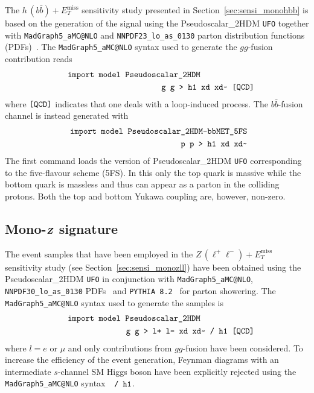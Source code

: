 \documentclass[a4paper, 11pt,notoc]{article}
\newcommand{\MET}{\ensuremath{E_T^\mathrm{miss}}\xspace}
\def\bm#1{\mbox{\boldmath$#1$\unboldmath}}
\begin{document}
The $h \, (b \bar b) + \MET$ sensitivity study presented in Section~\ref{sec:sensi_monohbb} is based on the generation of the signal using the Pseudoscalar\_2HDM {\tt UFO} together with {\tt MadGraph5\_aMC@NLO} and {\tt NNPDF23\_lo\_as\_0130} parton distribution functions (PDFs)~\cite{Ball:2012cx}. The {\tt MadGraph5\_aMC@NLO}  syntax used to generate the $gg$-fusion contribution reads 
\begin{eqnarray}
&& \verb| import model Pseudoscalar_2HDM | \hspace{2.25cm} \nonumber \\
&& \verb| g g > h1 xd xd~ [QCD] | \nonumber 
\end{eqnarray}
where  $\verb|[QCD]|$ indicates that one deals with a loop-induced process. The $b \bar b$-fusion channel is instead generated with 
\begin{eqnarray}
&& \verb| import model Pseudoscalar_2HDM-bbMET_5FS  | \nonumber \\
&& \verb| p p > h1 xd xd~  | \nonumber 
\end{eqnarray}
The first command loads the version of Pseudoscalar\_2HDM {\tt UFO}  corresponding to the five-flavour scheme (5FS). In this only the top quark is massive while the bottom quark is massless and thus 
can appear as a parton in the colliding protons. Both the top and bottom Yukawa coupling  are, however, non-zero.

\subsection{Mono-$\bm{Z}$ signature}

The event samples that have been employed in the $Z \, (\ell^+ \ell^-) + \MET$ sensitivity study (see Section~\ref{sec:sensi_monozll}) have been obtained using the Pseudoscalar\_2HDM {\tt UFO} in conjunction with {\tt MadGraph5\_aMC@NLO}, {\tt NNPDF30\_lo\_as\_0130} PDFs~\cite{Ball:2014uwa} and  {\tt PYTHIA~8.2}~\cite{Sjostrand:2014zea} for parton showering.  The {\tt MadGraph5\_aMC@NLO}  syntax used to generate the samples is 
\begin{eqnarray}
&& \verb| import model Pseudoscalar_2HDM | \hspace{2.25cm} \nonumber \\
&& \verb| g g > l+ l- xd xd~ / h1 [QCD] | \nonumber 
\end{eqnarray}
where $l = e$ or $\mu$ and only contributions from $gg$-fusion have been considered.  To increase the efficiency of the event generation, Feynman diagrams with an intermediate $s$-channel SM Higgs boson have been explicitly rejected using the  {\tt MadGraph5\_aMC@NLO} syntax~~$\verb|/ h1|$.
\end{document}
